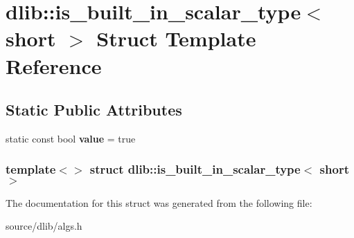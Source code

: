 \hypertarget{structdlib_1_1is__built__in__scalar__type_3_01short_01_4}{
\section{dlib::is\_\-built\_\-in\_\-scalar\_\-type$<$ short $>$ Struct Template Reference}
\label{structdlib_1_1is__built__in__scalar__type_3_01short_01_4}
}
\subsection*{Static Public Attributes}
\begin{DoxyCompactItemize}
\item 
\hypertarget{structdlib_1_1is__built__in__scalar__type_3_01short_01_4_a6959fdd1c59e7f0b28ed9a8d18f4c550}{
static const bool {\bfseries value} = true}
\label{structdlib_1_1is__built__in__scalar__type_3_01short_01_4_a6959fdd1c59e7f0b28ed9a8d18f4c550}

\end{DoxyCompactItemize}
\subsubsection*{template$<$$>$ struct dlib::is\_\-built\_\-in\_\-scalar\_\-type$<$ short $>$}



The documentation for this struct was generated from the following file:\begin{DoxyCompactItemize}
\item 
source/dlib/algs.h\end{DoxyCompactItemize}
